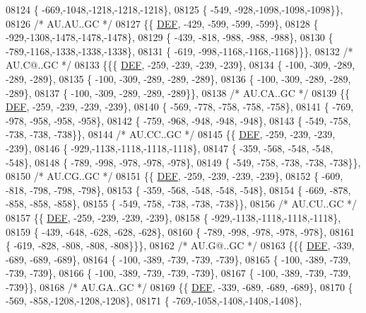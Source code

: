 \begin{DoxyCode}
08124 \{ -669,-1048,-1218,-1218,-1218\},
08125 \{ -549, -928,-1098,-1098,-1098\}\},
08126 \textcolor{comment}{/* AU.AU..GC */}
08127 \{\{  \mbox{\hyperlink{1_88_84__epars_8h_a397419fc12b37ed479c8abb9d444d843}{DEF}}, -429, -599, -599, -599\},
08128 \{ -929,-1308,-1478,-1478,-1478\},
08129 \{ -439, -818, -988, -988, -988\},
08130 \{ -789,-1168,-1338,-1338,-1338\},
08131 \{ -619, -998,-1168,-1168,-1168\}\}\},
08132 \textcolor{comment}{/* AU.C@..GC */}
08133 \{\{\{  \mbox{\hyperlink{1_88_84__epars_8h_a397419fc12b37ed479c8abb9d444d843}{DEF}}, -259, -239, -239, -239\},
08134 \{ -100, -309, -289, -289, -289\},
08135 \{ -100, -309, -289, -289, -289\},
08136 \{ -100, -309, -289, -289, -289\},
08137 \{ -100, -309, -289, -289, -289\}\},
08138 \textcolor{comment}{/* AU.CA..GC */}
08139 \{\{  \mbox{\hyperlink{1_88_84__epars_8h_a397419fc12b37ed479c8abb9d444d843}{DEF}}, -259, -239, -239, -239\},
08140 \{ -569, -778, -758, -758, -758\},
08141 \{ -769, -978, -958, -958, -958\},
08142 \{ -759, -968, -948, -948, -948\},
08143 \{ -549, -758, -738, -738, -738\}\},
08144 \textcolor{comment}{/* AU.CC..GC */}
08145 \{\{  \mbox{\hyperlink{1_88_84__epars_8h_a397419fc12b37ed479c8abb9d444d843}{DEF}}, -259, -239, -239, -239\},
08146 \{ -929,-1138,-1118,-1118,-1118\},
08147 \{ -359, -568, -548, -548, -548\},
08148 \{ -789, -998, -978, -978, -978\},
08149 \{ -549, -758, -738, -738, -738\}\},
08150 \textcolor{comment}{/* AU.CG..GC */}
08151 \{\{  \mbox{\hyperlink{1_88_84__epars_8h_a397419fc12b37ed479c8abb9d444d843}{DEF}}, -259, -239, -239, -239\},
08152 \{ -609, -818, -798, -798, -798\},
08153 \{ -359, -568, -548, -548, -548\},
08154 \{ -669, -878, -858, -858, -858\},
08155 \{ -549, -758, -738, -738, -738\}\},
08156 \textcolor{comment}{/* AU.CU..GC */}
08157 \{\{  \mbox{\hyperlink{1_88_84__epars_8h_a397419fc12b37ed479c8abb9d444d843}{DEF}}, -259, -239, -239, -239\},
08158 \{ -929,-1138,-1118,-1118,-1118\},
08159 \{ -439, -648, -628, -628, -628\},
08160 \{ -789, -998, -978, -978, -978\},
08161 \{ -619, -828, -808, -808, -808\}\}\},
08162 \textcolor{comment}{/* AU.G@..GC */}
08163 \{\{\{  \mbox{\hyperlink{1_88_84__epars_8h_a397419fc12b37ed479c8abb9d444d843}{DEF}}, -339, -689, -689, -689\},
08164 \{ -100, -389, -739, -739, -739\},
08165 \{ -100, -389, -739, -739, -739\},
08166 \{ -100, -389, -739, -739, -739\},
08167 \{ -100, -389, -739, -739, -739\}\},
08168 \textcolor{comment}{/* AU.GA..GC */}
08169 \{\{  \mbox{\hyperlink{1_88_84__epars_8h_a397419fc12b37ed479c8abb9d444d843}{DEF}}, -339, -689, -689, -689\},
08170 \{ -569, -858,-1208,-1208,-1208\},
08171 \{ -769,-1058,-1408,-1408,-1408\},

\end{DoxyCode}
